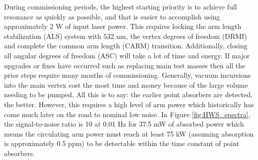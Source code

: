 	During commissioning periods, the highest starting priority is to achieve full resonance as quickly as possible, and that is easier to accomplish using approximately 2 W of input laser power. This requires locking the arm length stabilization (ALS) system with 532 nm, the vertex degrees of freedom (DRMI) and complete the common arm length (CARM) transition. Additionally, closing all angular degrees of freedom (ASC) will take a lot of time and energy.  If major upgrades or fixes have occurred such as replacing main test masses then all the prior steps require many months of commissioning.  Generally, vacuum incursions into the main vertex cost the most time and money because of the large volume needing to be pumped.  All this is to say: the earlier point absorbers are detected, the better.  However, this requires a high level of arm power which historically has come much later on the road to nominal low noise.  In Figure \ref{fig:HWS_spectra}, the signal-to-noise ratio is 10 at 0.01 Hz for 37.5 mW of absorbed power which means the circulating arm power must reach at least 75 kW  (assuming absorption is approximately 0.5 ppm) to be detectable within the time constant of point absorbers.
	

